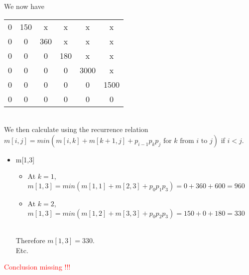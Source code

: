 \documentclass[11pt]{article}
\begin{document}
\begin{enumerate}
\begin{itemize}
    \end{itemize}
    We now have \\
    \begin{tabular}{ c c c c c c }
    0 & 150 & x & x & x & x \\
    0 & 0 & 360 & x & x & x \\
    0 & 0 & 0 & 180 & x & x \\
    0 & 0 & 0 & 0 & 3000 & x \\
    0 & 0 & 0 & 0 & 0 & 1500 \\
    0 & 0 & 0 & 0 & 0 & 0 \\
    \end{tabular}
    \\ We then calculate using the recurrence relation $m[i,j] = min(m[i,k] + m[k+1, j] + p_{i-1}p_kp_j \mbox{ for } k \mbox{ from } i \mbox{ to } j)$ if $i < j$.
    \begin{itemize}
        \item m[1,3]
        \begin{itemize}
            \item At $k = 1$, $m[1,3] = min(m[1,1] + m[2, 3] + p_{0}p_1p_3) = 0+360+600 = 960$
            \item At $k = 2$, $m[1,3] = min(m[1,2] + m[3, 3] + p_{0}p_2p_3) = 150+0+180 = 330$
        \end{itemize}
        \\ Therefore $m[1,3] = 330$.
        \\ Etc.
    \end{itemize}
    \textcolor{red}{Conclusion missing !!!}
    
    
    

\end{enumerate}
\end{document}
